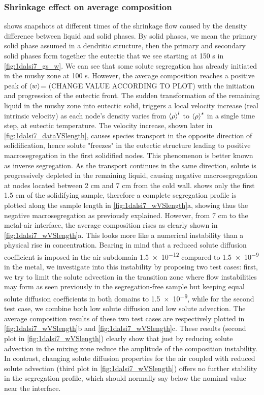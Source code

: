 \subsubsection{Shrinkage effect on average composition}
 shows snapshots at different times of the shrinkage flow caused by the density difference between liquid and solid phases.
By solid phases, we mean the primary solid phase assumed in a dendritic structure, then the primary and secondary solid phases form together the eutectic
that we see starting at 150 s in \cref{fig:1dalsi7_gs_w}. We can see that some solute segregation has already initiated in the mushy zone at 100 s.
However, the average composition reaches a positive peak of $\left \langle w \right \rangle$= (CHANGE VALUE ACCORDING TO PLOT) with the initiation and progression of the eutectic front.
The sudden transformation of the remaining liquid in the mushy zone into eutectic solid, triggers a local velocity increase (real intrinsic velocity)
as each node's density varies from $\left \langle \rho \right \rangle^l$ to $\left \langle \rho \right \rangle^s$ in a single time step, at eutectic temperature. The velocity increase, shown later in \cref{fig:1dalsi7_dataVSlength},
causes species transport in the opposite direction of solidification, hence solute "freezes" in the eutectic structure leading to positive macrosegregation
in the first solidified nodes. This phenomenon is better known as inverse segregation. 
As the transport continues in the same direction, 
solute is progressively depleted in the remaining liquid, causing negative macrosegregation at nodes located between 2 cm and 7 cm from the cold wall.
 shows only the first 1.5 cm of the solidifying sample, therefore a complete segregation profile is plotted along the sample length in \cref{fig:1dalsi7_wVSlength}a,
showing thus the negative macrosegregation as previously explained.
However, from 7 cm to the metal-air interface, the average composition rises as clearly shown in \cref{fig:1dalsi7_wVSlength}a. This looks more like a numerical
instability than a physical rise in concentration. 
Bearing in mind that a reduced solute diffusion coefficient is imposed in the air subdomain \SI{1.5e-12}{\udiffusivity} compared to 
\SI{1.5e-9}{\udiffusivity} in the metal, we investigate into this instability by proposing two test cases: first, we try to limit the solute advection in the transition
zone where flow instabilities may form as seen previously in the segregation-free sample but keeping equal solute diffusion coefficients in both domains to \SI{1.5e-9}{\udiffusivity},
while for the second test case, we combine both low solute diffusion and low solute advection. The average composition results of these two test cases
are respectively plotted in \cref{fig:1dalsi7_wVSlength}b and \cref{fig:1dalsi7_wVSlength}c.
These results (second plot in \cref{fig:1dalsi7_wVSlength})  clearly show that just by reducing solute advection in the mixing zone reduce the amplitude of the composition instability.
In contrast, changing solute diffusion properties for the air coupled with reduced solute advection (third plot in \cref{fig:1dalsi7_wVSlength}) offers no further stability
in the segregation profile, which should normally say below the nominal value near the interface.

